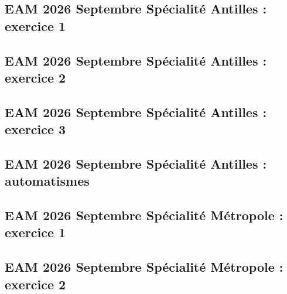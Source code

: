 \documentclass[lang=fr,edition=teacher,layout=sheet]{mxbook}
\begin{document}
\begingroup\endgroup
\par\bigskip
{}\subsection*{EAM 2026 Septembre Spécialité Antilles : exercice 1}
\begingroup\endgroup
\par\bigskip
{}\subsection*{EAM 2026 Septembre Spécialité Antilles : exercice 2}
\begingroup\endgroup
\par\bigskip
{}\subsection*{EAM 2026 Septembre Spécialité Antilles : exercice 3}
\begingroup\endgroup
\par\bigskip
{}\subsection*{EAM 2026 Septembre Spécialité Antilles : automatismes}
\begingroup\endgroup
\par\bigskip
{}\subsection*{EAM 2026 Septembre Spécialité Métropole : exercice 1}
\begingroup\endgroup
\par\bigskip
{}\subsection*{EAM 2026 Septembre Spécialité Métropole : exercice 2}
\begingroup\endgroup
\end{document}
